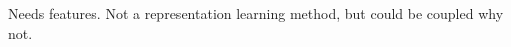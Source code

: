 \documentclass[english]{scrartcl}
\begin{document}
Needs features. Not a representation learning method, but could be coupled why not.







\end{document}
